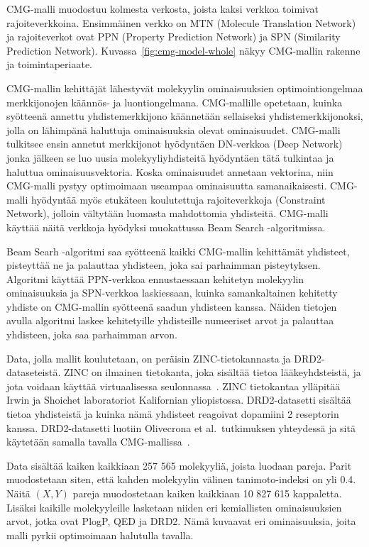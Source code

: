 \documentclass[finnish,twoside,censored,tkt,sw-line]{HYthesisML}
\begin{document}
CMG-malli muodostuu kolmesta verkosta, joista kaksi verkkoa toimivat rajoiteverkkoina.
Ensimmäinen verkko on MTN (Molecule Translation Network) ja rajoiteverkot ovat PPN (Property Prediction Network) ja SPN (Similarity Prediction Network).
Kuvassa~\ref{fig:cmg-model-whole} näkyy CMG-mallin rakenne ja toimintaperiaate.

CMG-mallin kehittäjät lähestyvät molekyylin ominaisuuksien optimointiongelmaa merkkijonojen käännös- ja luontiongelmana.
CMG-mallille opetetaan, kuinka syötteenä annettu yhdistemerkkijono käännetään sellaiseksi yhdistemerkkijonoksi, jolla on lähimpänä haluttuja ominaisuuksia olevat ominaisuudet.
CMG-malli tulkitsee ensin annetut merkkijonot hyödyntäen DN-verkkoa (Deep Network) jonka jälkeen se luo uusia molekyyliyhdisteitä hyödyntäen tätä tulkintaa ja haluttua ominaisuusvektoria.
Koska ominaisuudet annetaan vektorina, niin CMG-malli pystyy optimoimaan useampaa ominaisuutta samanaikaisesti.
CMG-malli hyödyntää myös etukäteen koulutettuja rajoiteverkkoja (Constraint Network), jolloin vältytään luomasta mahdottomia yhdisteitä.
CMG-malli käyttää näitä verkkoja hyödyksi muokattussa Beam Search -algoritmissa.

Beam Searh -algoritmi saa syötteenä kaikki CMG-mallin kehittämät yhdisteet, pisteyttää ne ja palauttaa yhdisteen, joka sai parhaimman pisteytyksen.
Algoritmi käyttää PPN-verkkoa ennustaessaan kehitetyn molekyylin ominaisuuksia ja SPN-verkkoa laskiessaan, kuinka samankaltainen kehitetty yhdiste on CMG-mallin syötteenä saadun yhdisteen kanssa.
Näiden tietojen avulla algoritmi laskee kehitetyille yhdisteille numeeriset arvot ja palauttaa yhdisteen, joka saa parhaimman arvon.

Data, jolla mallit koulutetaan, on peräisin ZINC-tietokannasta ja DRD2-dataseteistä.
ZINC on ilmainen tietokanta, joka sisältää tietoa lääkeyhdsteistä, ja jota voidaan käyttää virtuaalisessa seulonnassa~\cite{ZINC}.
ZINC tietokantaa ylläpitää Irwin ja Shoichet laboratoriot Kalifornian yliopistossa.
DRD2-datasetti sisältää tietoa yhdisteistä ja kuinka nämä yhdisteet reagoivat dopamiini 2 reseptorin kanssa.
DRD2-datasetti luotiin Olivecrona et al.\ tutkimuksen yhteydessä ja sitä käytetään samalla tavalla CMG-mallissa~\cite{ShinBonggun}.

Data sisältää kaiken kaikkiaan 257 565 molekyyliä, joista luodaan pareja.
Parit muodostetaan siten, että kahden molekyylin välinen tanimoto-indeksi on yli 0.4.
Näitä \((X,Y)\) pareja muodostetaan kaiken kaikkiaan 10 827 615 kappaletta.
Lisäksi kaikille molekyyleille lasketaan niiden eri kemiallisten ominaisuuksien arvot, jotka ovat PlogP, QED ja DRD2.
Nämä kuvaavat eri ominaisuuksia, joita malli pyrkii optimoimaan halutulla tavalla.
\end{document}

